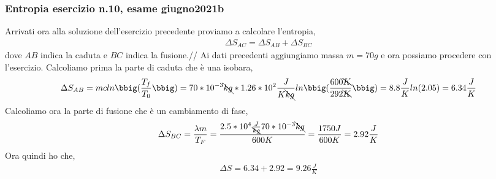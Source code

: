         \subsubsection{Entropia esercizio n.10, esame giugno2021b}
            Arrivati ora alla soluzione dell'esercizio precedente proviamo a calcolare l'entropia,
            \begin{align*}
                \Delta S_{AC} = \Delta S_{AB} + \Delta S_{BC}
            \end{align*}
            dove $AB$ indica la caduta e $BC$ indica la fusione.//
            Ai dati precedenti aggiungiamo massa $m=70g$ e ora possiamo procedere con l'esercizio. Calcoliamo prima la parte di caduta che è una isobara,
            \begin{align*}
                \Delta S_{AB} = mcln\bbig(\frac{T_f}{T_0}\bbig)=70*10^{-3}\bcancel{kg}*1.26*10^2\frac{J}{K\bcancel{kg}}ln\bbig(\frac{600\bcancel{K}}{292\bcancel{K}}\bbig)= 8.8\frac{J}{K}ln(2.05)=6.34\frac{J}{K}
            \end{align*}
            Calcoliamo ora la parte di fusione che è un cambiamento di fase,
            \begin{align*}
                \Delta S_{BC} = \frac{\lambda m}{T_F} = \frac{2.5*10^4\frac{J}{\bcancel{kg}}70*10^{-3}\bcancel{kg}}{600K} = \frac{1750J}{600K} = 2.92\frac{J}{K}
            \end{align*}
            Ora quindi ho che,
            \begin{align*}
                \Delta S = 6.34 + 2.92 = 9.26\frac{J}{K}
            \end{align*}

